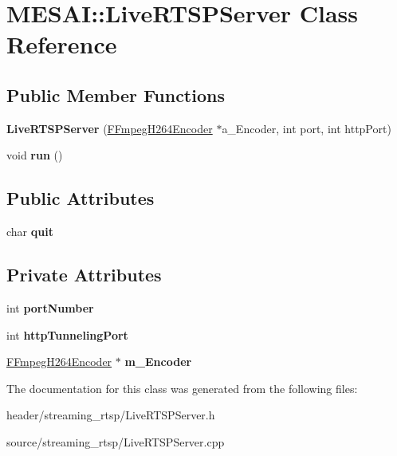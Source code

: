 \hypertarget{class_m_e_s_a_i_1_1_live_r_t_s_p_server}{}\section{M\+E\+S\+AI\+:\+:Live\+R\+T\+S\+P\+Server Class Reference}
\label{class_m_e_s_a_i_1_1_live_r_t_s_p_server}
\subsection*{Public Member Functions}
\begin{DoxyCompactItemize}
\item 
\mbox{\label{class_m_e_s_a_i_1_1_live_r_t_s_p_server_accec1d70277e75738a0c8a18f2ec3910}} 
{\bfseries Live\+R\+T\+S\+P\+Server} (\hyperlink{class_m_e_s_a_i_1_1_f_fmpeg_h264_encoder}{F\+Fmpeg\+H264\+Encoder} $\ast$a\+\_\+\+Encoder, int port, int http\+Port)
\item 
\mbox{\label{class_m_e_s_a_i_1_1_live_r_t_s_p_server_af2c4485fe741db66e33720c9594b051a}} 
void {\bfseries run} ()
\end{DoxyCompactItemize}
\subsection*{Public Attributes}
\begin{DoxyCompactItemize}
\item 
\mbox{\label{class_m_e_s_a_i_1_1_live_r_t_s_p_server_aebd94b0bf5fd6b0459f59546c7893ce6}} 
char {\bfseries quit}
\end{DoxyCompactItemize}
\subsection*{Private Attributes}
\begin{DoxyCompactItemize}
\item 
\mbox{\label{class_m_e_s_a_i_1_1_live_r_t_s_p_server_aac3c21633d40fc11a2801548c268268e}} 
int {\bfseries port\+Number}
\item 
\mbox{\label{class_m_e_s_a_i_1_1_live_r_t_s_p_server_afedbabbc6a0463110a9069986170a22d}} 
int {\bfseries http\+Tunneling\+Port}
\item 
\mbox{\label{class_m_e_s_a_i_1_1_live_r_t_s_p_server_a7813142eea72e8cb1aff5c2c3efeb8c8}} 
\hyperlink{class_m_e_s_a_i_1_1_f_fmpeg_h264_encoder}{F\+Fmpeg\+H264\+Encoder} $\ast$ {\bfseries m\+\_\+\+Encoder}
\end{DoxyCompactItemize}


The documentation for this class was generated from the following files\+:\begin{DoxyCompactItemize}
\item 
header/streaming\+\_\+rtsp/Live\+R\+T\+S\+P\+Server.\+h\item 
source/streaming\+\_\+rtsp/Live\+R\+T\+S\+P\+Server.\+cpp\end{DoxyCompactItemize}
